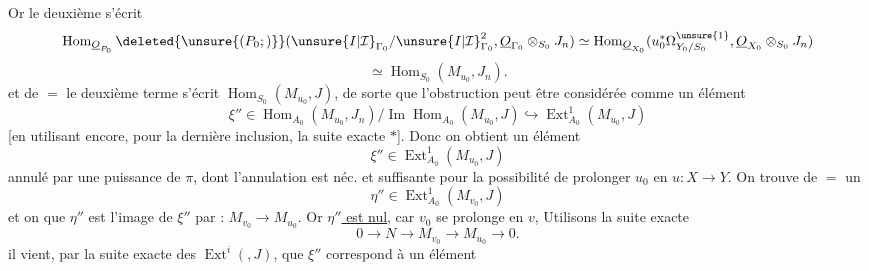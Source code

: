 Or le  deuxième  s'écrit
\[
\operatorname{Hom}_{\underline{O}_{P_0}}\deleted{\unsure{(P_0;)}}
(\unsure{I|\mathcal{I}}_{\Gamma_0}/\unsure{I|\mathcal{I}}_{\Gamma_0}^{2},\underline{O}_{\Gamma_0}\otimes_{S_0}J_n)
\simeq\operatorname{Hom}_{\underline{O}_{X_0}}(u_0^*\Omega^{\unsure{1}}_{Y_0/S_0},\underline{O}_{X_0}\otimes_{S_0}J_n)
\]
\[
\simeq\operatorname{Hom}_{S_0}(M_{u_0},J_n).
\]
et de $=$ le deuxième terme s'écrit
$\operatorname{Hom}_{S_0}(M_{u_0},J)$, de sorte que l'obstruction
peut être considérée comme un élément
\[
\xi''\in\operatorname{Hom}_{A_0}(M_{u_0},J_n)/\operatorname{Im}\operatorname{Hom}_{A_0}(M_{u_0},J)
\hookrightarrow\operatorname{Ext}^{1}_{A_0}(M_{u_0},J)
\]
[en utilisant encore, pour la dernière inclusion,
la suite exacte $*$]. Donc on obtient un
élément
\[
\xi''\in\operatorname{Ext}^{1}_{A_0}(M_{u_0},J)
\]
annulé par une puissance de $\pi$, dont l'annulation
est néc. et suffisante pour la possibilité de
prolonger $u_0$ en $u:X\longrightarrow Y$. On trouve de
 $=$ un
\[
\eta''\in\operatorname{Ext}^{1}_{A_0}(M_{v_0},J)
\]
et on  que $\eta''$ est l'image de $\xi''$
par : $M_{v_0}\longrightarrow M_{u_0}$. Or \uline{$\eta''$ est nul}, car
$v_0$ se prolonge en $v$,  Utilisons la suite exacte
\[
0\longrightarrow N\longrightarrow M_{v_0}\longrightarrow M_{u_0}\longrightarrow0.
\]
il vient, par la suite exacte des $\operatorname{Ext}^{i}(,J)$, que
$\xi''$ correspond à un élément
